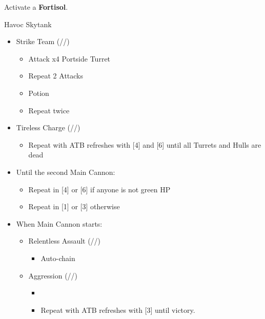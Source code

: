 \documentclass{report}
\begin{document}
\renewcommand{\first}{[1] Aggression (\com/\com/\rav)}
\renewcommand{\second}{[2] Relentless Assault (\rav/\com/\rav)}
\renewcommand{\third}{[3] Aggression (\com/\com/\rav)}
\renewcommand{\fourth}{[4] Tireless Charge (\com/\com/\med)}
\renewcommand{\fifth}{[5] Strike Team (\com/\com/\syn)}
\renewcommand{\sixth}{[6] Tireless Charge (\com/\com/\med)}

Activate a \textbf{Fortisol}.

\begin{battle}{Havoc Skytank}
\begin{itemize}
    \item \fifth
    \begin{itemize}
        \item Attack x4 Portside Turret
        \item Repeat 2 Attacks
        \item Potion
        \item Repeat twice
    \end{itemize}
    \item \fourth
    \begin{itemize}
        \item Repeat with ATB refreshes with [4] and [6] until all Turrets and Hulls are dead
    \end{itemize}
    \item Until the second Main Cannon:
    \begin{itemize}
        \item Repeat in [4] or [6] if anyone is not green HP
        \item Repeat in [1] or [3] otherwise
    \end{itemize}
    \item When Main Cannon starts:
    \begin{itemize}
        \item \second
        \begin{itemize}
            \item Auto-chain
        \end{itemize}
        \item \first
        \begin{itemize}
            \item \stagger
            \item Repeat with ATB refreshes with [3] until victory.
        \end{itemize}
    \end{itemize}
\end{itemize}
\end{battle}
\end{document}
